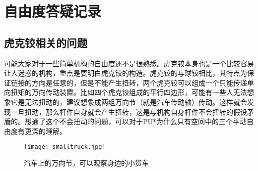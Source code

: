 \section{自由度答疑记录}

\subsection{虎克铰相关的问题}

可能大家对于一些简单机构的自由度还不是很熟悉。虎克铰本身也是一个比较容易让人迷惑的机构，重点是要明白虎克铰的构造。虎克铰的与球铰相比，其特点为保证链接的方向是任意的，但是不能产生扭转，两个虎克铰可以组成一个只能传递单向扭矩的万向传动装置。比如四个虎克铰组成的平行四边形，可能有一些人无法想象它是无法扭动的，建议想象成两组万向节（就是汽车传动轴）传动。这样就会发现一旦扭动，那么杆件自身就会产生扭转，这是与机构自身杆件不会扭转的假设矛盾的。想通了这个不会扭动的问题，可以对于PU*为什么只有空间中的三个平动自由度有更深的理解。

\begin{figure}[htb]
    \centering
    \texttt{[image: smalltruck.jpg]}
    \caption{汽车上的万向节，可以观察身边的小货车}
\end{figure}

